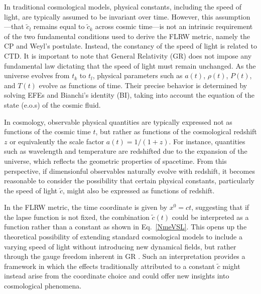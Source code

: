 \documentclass[jkps,preprint,fleqn]{revtex4} %
\newcommand{\tc}{\tilde{c}}
\begin{document}
In traditional cosmological models, physical constants, including the speed of light, are typically assumed to be invariant over time. However, this assumption—that $\tc_l$ remains equal to $\tc_k$ across cosmic time—is not an intrinsic requirement of the two fundamental conditions used to derive the FLRW metric, namely the CP and Weyl’s postulate. Instead, the constancy of the speed of light is related to CTD. It is important to note that General Relativity (GR) does not impose any fundamental law dictating that the speed of light must remain unchanged. As the universe evolves from $t_k$ to $t_l$, physical parameters such as $a(t)$, $\rho(t)$, $P(t)$, and $T(t)$ evolve as functions of time. Their precise behavior is determined by solving EFEs and Bianchi’s identity (BI), taking into account the equation of the state (e.o.s) of the cosmic fluid.

In cosmology, observable physical quantities are typically expressed not as functions of the cosmic time $t$, but rather as functions of the cosmological redshift $z$ or equivalently the scale factor $a(t) = 1/(1+z)$. For instance, quantities such as wavelength and temperature are redshifted due to the expansion of the universe, which reflects the geometric properties of spacetime. From this perspective, if dimensionful observables naturally evolve with redshift, it becomes reasonable to consider the possibility that certain physical constants, particularly the speed of light $\tc$, might also be expressed as functions of redshift. 

In the FLRW metric, the time coordinate is given by $x^0 = ct$, suggesting that if the lapse function is not fixed, the combination $\tc(t)$ could be interpreted as a function rather than a constant as shown in Eq.~\eqref{NmeVSL}. This opens up the theoretical possibility of extending standard cosmological models to include a varying speed of light without introducing new dynamical fields, but rather through the gauge freedom inherent in GR \cite{Lee:2024zcu}. Such an interpretation provides a framework in which the effects traditionally attributed to a constant $\tc$ might instead arise from the coordinate choice and could offer new insights into cosmological phenomena.
\end{document}
